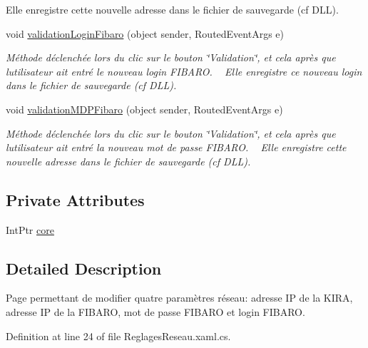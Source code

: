 \begin{DoxyCompactItemize}
\begin{DoxyCompactList}
Elle enregistre cette nouvelle adresse dans le fichier de sauvegarde (cf D\+LL). \end{DoxyCompactList}\item 
void \hyperlink{class_my_domotik_1_1_reglages_reseau_a1704cbfeb21fa4aeb821a5783dc72c4c}{validation\+Login\+Fibaro} (object sender, Routed\+Event\+Args e)
\begin{DoxyCompactList}\small\item\em Méthode déclenchée lors du clic sur le bouton \char`\"{}\+Validation\char`\"{}, et cela après que l\textquotesingle{}utilisateur ait entré le nouveau login F\+I\+B\+A\+RO. ~\newline
Elle enregistre ce nouveau login dans le fichier de sauvegarde (cf D\+LL). \end{DoxyCompactList}\item 
void \hyperlink{class_my_domotik_1_1_reglages_reseau_a320efe3c3ef3f4b18b36a6e9da5ddc1f}{validation\+M\+D\+P\+Fibaro} (object sender, Routed\+Event\+Args e)
\begin{DoxyCompactList}\small\item\em Méthode déclenchée lors du clic sur le bouton \char`\"{}\+Validation\char`\"{}, et cela après que l\textquotesingle{}utilisateur ait entré la nouveau mot de passe F\+I\+B\+A\+RO. ~\newline
Elle enregistre cette nouvelle adresse dans le fichier de sauvegarde (cf D\+LL). \end{DoxyCompactList}\end{DoxyCompactItemize}
\subsection*{Private Attributes}
\begin{DoxyCompactItemize}
\item 
Int\+Ptr \hyperlink{class_my_domotik_1_1_reglages_reseau_a54bd091d62d190419ec8061307d0bc9e}{core}
\end{DoxyCompactItemize}


\subsection{Detailed Description}
Page permettant de modifier quatre paramètres réseau\+: adresse IP de la K\+I\+RA, adresse IP de la F\+I\+B\+A\+RO, mot de passe F\+I\+B\+A\+RO et login F\+I\+B\+A\+RO. 



Definition at line 24 of file Reglages\+Reseau.\+xaml.\+cs.



